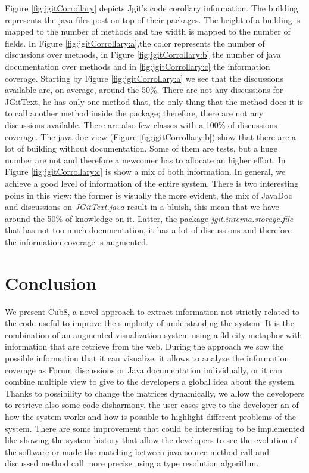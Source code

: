 \documentclass[]{usiinfbachelorproject}
\begin{document}
Figure \ref{fig:jgitCorrollary} depicts Jgit's code corollary information. The building represents the java files post on top of their packages. The height of a building is mapped to the number of methods and the width is mapped to the number of fields. In  Figure \ref{fig:jgitCorrollary:a},the color represents  the number of discussions over methods, in Figure \ref{fig:jgitCorrollary:b} the number of java documentation over methods and in  \ref{fig:jgitCorrollary:c} the information coverage.
Starting by Figure \ref{fig:jgitCorrollary:a} we see that the discussions available are, on average, around the 50\%. There are not any discussions for JGitText, he has only one method that, the only thing that the method does it is to call another method inside the package; therefore, there are not any discussions available. There are also few classes with a 100\% of discussions coverage.
The java doc view (Figure  \ref{fig:jgitCorrollary:b}) show that there are a lot of building without documentation. Some of them are tests, but a huge number are not and therefore a newcomer has to allocate an higher effort.  
In Figure  \ref{fig:jgitCorrollary:c} is show a mix of both information. In general, we achieve a good level of information of the entire system. There is two interesting poins in this view: the former is  visually the more evident, the mix of JavaDoc and discussions on  \textit{JGitText.java} result in a bluish, this mean that we have around the 50\% of knowledge on it. Latter, the package \textit{jgit.interna.storage.file} that has not too much documentation, it has a lot  of discussions and therefore the information coverage is augmented. 














\newpage
\section{Conclusion} \label{conclusion}
We present Cub8, a novel approach to extract information not strictly related to the code useful to improve the simplicity of understanding the system. It is the combination of an augmented visualization system using a 3d city metaphor with information that are retrieve from the web. During the approach we sow the possible information that it can visualize, it allows to analyze the information coverage as Forum discussions or Java documentation individually, or it can combine multiple view to give to the developers a global idea about the system. Thanks to possibility to change the matrices dynamically, we allow the developers to retrieve also some code disharmony. the user cases give to the developer an of  how the system works and how is possible to highlight different problems of the system.
There are some improvement that could be interesting to be implemented like showing the system history that allow the developers to see the evolution of the software or made the matching between java source method call and discussed method call more precise using a type resolution algorithm.
  
  

\newpage



\end{document}
